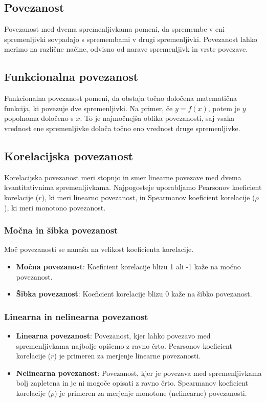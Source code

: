 \subsection*{Povezanost}

Povezanost med dvema spremenljivkama pomeni, da spremembe v eni spremenljivki sovpadajo s spremembami v drugi spremenljivki. Povezanost lahko merimo na različne načine, odvisno od narave spremenljivk in vrste povezave.

\subsection*{Funkcionalna povezanost}
Funkcionalna povezanost pomeni, da obstaja točno določena matematična funkcija, ki povezuje dve spremenljivki. Na primer, če $y = f(x)$, potem je $y$ popolnoma določeno s $x$. To je najmočnejša oblika povezanosti, saj vsaka vrednost ene spremenljivke določa točno eno vrednost druge spremenljivke.

\subsection*{Korelacijska povezanost}
Korelacijska povezanost meri stopnjo in smer linearne povezave med dvema kvantitativnima spremenljivkama. Najpogosteje uporabljamo Pearsonov koeficient korelacije ($r$), ki meri linearno povezanost, in Spearmanov koeficient korelacije ($\rho$), ki meri monotono povezanost.

\subsubsection*{Močna in šibka povezanost}
Moč povezanosti se nanaša na velikost koeficienta korelacije. 
\begin{itemize}
    \item \textbf{Močna povezanost}: Koeficient korelacije blizu 1 ali -1 kaže na močno povezanost.
    \item \textbf{Šibka povezanost}: Koeficient korelacije blizu 0 kaže na šibko povezanost.
\end{itemize}

\subsubsection*{Linearna in nelinearna povezanost}
\begin{itemize}
    \item \textbf{Linearna povezanost}: Povezanost, kjer lahko povezavo med spremenljivkama najbolje opišemo z ravno črto. Pearsonov koeficient korelacije ($r$) je primeren za merjenje linearne povezanosti.
    \item \textbf{Nelinearna povezanost}: Povezanost, kjer je povezava med spremenljivkama bolj zapletena in je ni mogoče opisati z ravno črto. Spearmanov koeficient korelacije ($\rho$) je primeren za merjenje monotone (nelinearne) povezanosti.
\end{itemize}

